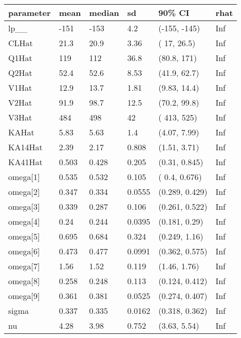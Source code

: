 
\begin{tabular}{l|l|l|l|l|l}
\hline
parameter & mean & median & sd & 90\% CI & rhat\\
\hline
lp\_\_ & -151 & -153 & 4.2 & (-155, -145) & Inf\\
\hline
CLHat & 21.3 & 20.9 & 3.36 & (  17, 26.5) & Inf\\
\hline
Q1Hat & 119 & 112 & 36.8 & (80.8,  171) & Inf\\
\hline
Q2Hat & 52.4 & 52.6 & 8.53 & (41.9, 62.7) & Inf\\
\hline
V1Hat & 12.9 & 13.7 & 1.81 & (9.83, 14.4) & Inf\\
\hline
V2Hat & 91.9 & 98.7 & 12.5 & (70.2, 99.8) & Inf\\
\hline
V3Hat & 484 & 498 & 42 & ( 413,  525) & Inf\\
\hline
KAHat & 5.83 & 5.63 & 1.4 & (4.07, 7.99) & Inf\\
\hline
KA14Hat & 2.39 & 2.17 & 0.808 & (1.51, 3.71) & Inf\\
\hline
KA41Hat & 0.503 & 0.428 & 0.205 & (0.31, 0.845) & Inf\\
\hline
omega[1] & 0.535 & 0.532 & 0.105 & ( 0.4, 0.676) & Inf\\
\hline
omega[2] & 0.347 & 0.334 & 0.0555 & (0.289, 0.429) & Inf\\
\hline
omega[3] & 0.339 & 0.287 & 0.106 & (0.261, 0.522) & Inf\\
\hline
omega[4] & 0.24 & 0.244 & 0.0395 & (0.181, 0.29) & Inf\\
\hline
omega[5] & 0.695 & 0.684 & 0.324 & (0.249, 1.16) & Inf\\
\hline
omega[6] & 0.473 & 0.477 & 0.0991 & (0.362, 0.575) & Inf\\
\hline
omega[7] & 1.56 & 1.52 & 0.119 & (1.46, 1.76) & Inf\\
\hline
omega[8] & 0.258 & 0.248 & 0.113 & (0.124, 0.412) & Inf\\
\hline
omega[9] & 0.361 & 0.381 & 0.0525 & (0.274, 0.407) & Inf\\
\hline
sigma & 0.337 & 0.335 & 0.0162 & (0.318, 0.362) & Inf\\
\hline
nu & 4.28 & 3.98 & 0.752 & (3.63, 5.54) & Inf\\
\hline
\end{tabular}
